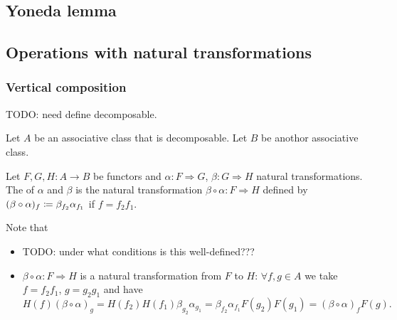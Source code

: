 \subsection{Yoneda lemma}


\subsection{Operations with natural transformations}
\subsubsection{Vertical composition}
TODO: need define decomposable.
\begin{definition}
Let $A$ be an associative class that is decomposable. Let $B$ be anothor associative class.

Let $F,G,H: A\to B$ be functors and $\alpha: F\Rightarrow G$, $\beta: G\Rightarrow H$ natural transformations. The  of $\alpha$ and $\beta$ is the natural transformation $\beta\circ\alpha: F\Rightarrow H$ defined by
$(\beta\circ\alpha)_{f} \coloneqq \beta_{f_2}\alpha_{f_1}$ if $f = f_2f_1$.
\end{definition}
Note that
\begin{itemize}
\item TODO: under what conditions is this well-defined???
\item $\beta\circ\alpha: F\Rightarrow H$ is a natural transformation from $F$ to $H$: $\forall f,g\in A$ we take $f = f_2f_1$, $g = g_2g_1$ and have
\[ H(f)(\beta\circ\alpha)_g = H(f_2)H(f_1)\beta_{g_2}\alpha_{g_1} =  \beta_{f_2}\alpha_{f_1}F(g_2)F(g_1) = (\beta\circ\alpha)_{f}F(g). \]
\end{itemize} 


